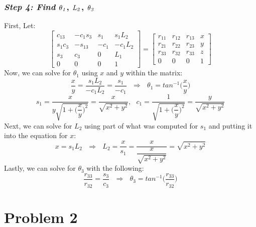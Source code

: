 \documentclass[10pt]{article}
\begin{document}
\subsubsection*{\textbf{\textit{Step 4: Find }}$\bf{\it{\theta_{1}}}$, $\bf{\it{L_{2}}}$, $\bf{\it{\theta_{3}}}$}
First, Let:
\[
\begin{bmatrix}
c_{13}           & -c_{1}s_{3}  & s_{1} & s_{1}L_{2}  \\
s_{1}c_{3}       & -s_{13}      & -c_{1}& -c_{1}L_{2} \\
s_{3}            & c_{3}        & 0     & L_{1}       \\
0                & 0            & 0     & 1
\end{bmatrix} = 
\begin{bmatrix}
r_{11} & r_{12} & r_{13} & x\\
r_{21} & r_{22} & r_{23} & y\\
r_{33} & r_{32} & r_{33} & z\\
0      & 0      & 0      & 1
\end{bmatrix}
\]
Now, we can solve for $\theta_{1}$ using $x$ and $y$ within the matrix:
\[
\dfrac{x}{y} = \dfrac{s_{1}L_{2}}{-c_{1}L_{2}} = \dfrac{s_{1}}{-c_{1}}
\mbox{     }\Rightarrow\mbox{     }
\theta_{1} = {tan^{-1}}\bigg(\dfrac{x}{y}\bigg)
\]
\[
s_{1} = \dfrac{x}{y\sqrt{1 + \bigg(\dfrac{x}{y}\bigg)^2}} =
\dfrac{x}{\sqrt{x^2 + y^2}}, \mbox{     }
c_{1} = \dfrac{1}{\sqrt{1 + \bigg(\dfrac{x}{y}\bigg)^2}} =
\dfrac{y}{\sqrt{x^2 + y^2}}
\]
Next, we can solve for $L_{2}$ using part of what was computed for $s_{1}$ and putting it into the equation for $x$:
\[
x = s_{1}L_{2} \mbox{     }\Rightarrow\mbox{     }
L_{2} = \dfrac{x}{s_{1}} = \dfrac{x}{\dfrac{x}{\sqrt{x^2 + y^2}}}
= \sqrt{x^2 + y^2}
\]
Lastly, we can solve for $\theta_{3}$ with the following:
\[
\dfrac{r_{33}}{r_{32}} = \dfrac{s_{3}}{c_{3}} \mbox{     } \Rightarrow \mbox{      }\theta_{3} = tan^{-1}\bigg(\dfrac{r_{33}}{r_{32}}\bigg)
\]

\section*{Problem 2}
\end{document}
